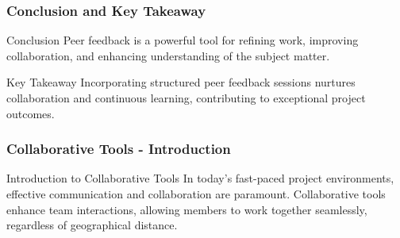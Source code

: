 \documentclass[aspectratio=169]{beamer}
\begin{document}
\begin{frame}[fragile]
    \frametitle{Conclusion and Key Takeaway}
    \begin{block}{Conclusion}
        Peer feedback is a powerful tool for refining work, improving collaboration, and enhancing understanding of the subject matter.
    \end{block}
    \begin{block}{Key Takeaway}
        Incorporating structured peer feedback sessions nurtures collaboration and continuous learning, contributing to exceptional project outcomes.
    \end{block}
\end{frame}

\begin{frame}[fragile]
    \frametitle{Collaborative Tools - Introduction}
    \begin{block}{Introduction to Collaborative Tools}
        In today’s fast-paced project environments, effective communication and collaboration are paramount. Collaborative tools enhance team interactions, allowing members to work together seamlessly, regardless of geographical distance.
    \end{block}
\end{frame}
\end{document}
